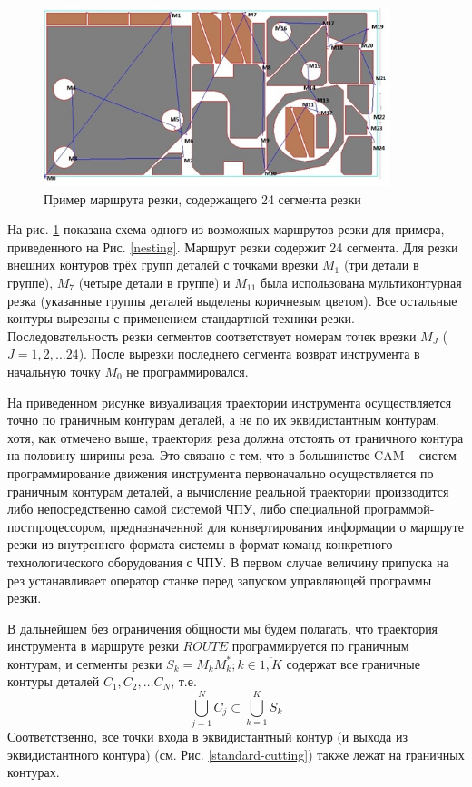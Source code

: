\documentclass{article}
\begin{document}
\begin{figure}
  \begin{center}
  \includegraphics[width=0.9\textwidth]{cutting.png}
  \caption{Пример маршрута резки, содержащего 24 сегмента резки}
  \label{cutting}
  \end{center}
\end{figure}

На рис. \ref{cutting}
показана схема одного из возможных маршрутов резки для примера,
приведенного на Рис. \ref{nesting}.
Маршрут резки содержит 24 сегмента.
Для резки внешних контуров трёх групп деталей
с точками врезки $M_1$
(три детали в группе),
$M_7$
(четыре детали в группе) и
$M_{11}$
была использована мультиконтурная резка
(указанные группы деталей выделены коричневым цветом).
Все остальные контуры вырезаны с применением стандартной техники резки.
Последовательность резки сегментов соответствует
номерам точек врезки $M_J$ ($J=1,2,\dots 24$).
После вырезки последнего сегмента
возврат инструмента в начальную точку $M_0$
не программировался.

На приведенном рисунке визуализация траектории инструмента
осуществляется точно по граничным контурам деталей,
а не по их эквидистантным контурам, хотя,
как отмечено выше,
траектория реза должна отстоять от
граничного контура на половину ширины реза.
Это связано с тем, что в большинстве CAM – систем
программирование движения инструмента первоначально
осуществляется по граничным контурам деталей,
а вычисление реальной траектории производится
либо непосредственно самой системой ЧПУ,
либо специальной программой-постпроцессором,
предназначенной для конвертирования информации о
маршруте резки из внутреннего формата системы в
формат команд конкретного технологического оборудования с ЧПУ.
В первом случае величину припуска на рез
устанавливает оператор станке перед запуском
управляющей программы резки.

В дальнейшем без ограничения общности мы будем полагать,
что траектория инструмента в маршруте резки $ROUTE$
программируется по граничным контурам,
и сегменты резки
$S_k=M_kM^*_k; k \in \overline{1,K}$
содержат все граничные контуры деталей
$C_1, C_2, \dots C_N$,
т.е.
$$
\bigcup_{j=1}^N C_j \subset \bigcup_{k=1}^K S_k
$$
Соответственно, все точки входа в эквидистантный контур
(и выхода из эквидистантного контура)
(см. Рис. \ref{standard-cutting})
также лежат на граничных контурах.
\end{document}
